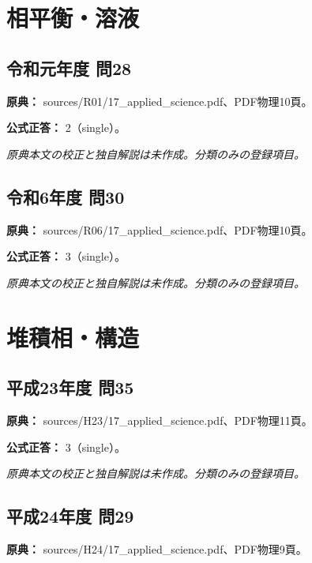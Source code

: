 \section{相平衡・溶液}

\subsection{令和元年度 問28}
\label{q:r01-reg-applied-28}

\noindent\textbf{原典：} sources/R01/17\_applied\_science.pdf、PDF物理10頁。

\textbf{公式正答：} 2（single）。

\par\textit{原典本文の校正と独自解説は未作成。分類のみの登録項目。}

\subsection{令和6年度 問30}
\label{q:r06-reg-applied-30}

\noindent\textbf{原典：} sources/R06/17\_applied\_science.pdf、PDF物理10頁。

\textbf{公式正答：} 3（single）。

\par\textit{原典本文の校正と独自解説は未作成。分類のみの登録項目。}

\section{堆積相・構造}

\subsection{平成23年度 問35}
\label{q:h23-reg-applied-35}

\noindent\textbf{原典：} sources/H23/17\_applied\_science.pdf、PDF物理11頁。

\textbf{公式正答：} 3（single）。

\par\textit{原典本文の校正と独自解説は未作成。分類のみの登録項目。}

\subsection{平成24年度 問29}
\label{q:h24-reg-applied-29}

\noindent\textbf{原典：} sources/H24/17\_applied\_science.pdf、PDF物理9頁。

